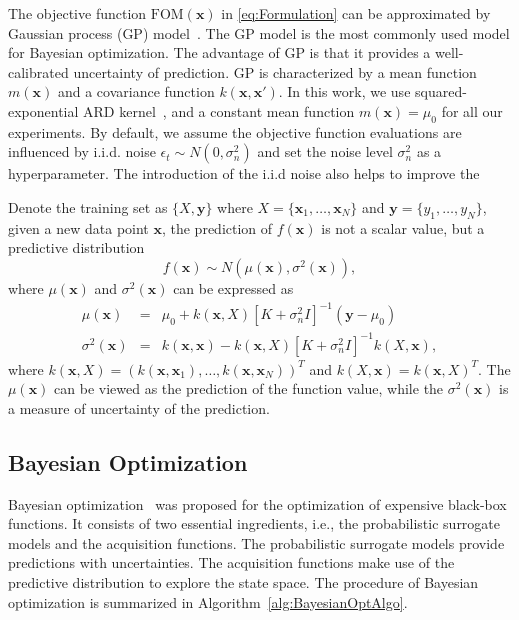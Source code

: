 The objective function $\mathrm{FOM}(\bm{x})$ in \eqref{eq:Formulation} can be
approximated by Gaussian process (GP) model~\cite{GPML}. The GP model is the
most commonly used model for Bayesian optimization. The advantage of GP is that
it provides a well-calibrated uncertainty of prediction. GP is characterized by
a mean function $m(\bm{x})$ and a covariance function $k(\bm{x}, \bm{x'})$. In
this work, we use squared-exponential ARD kernel~\cite{GPML}, and a constant
mean function $m(\bm{x}) = \mu_0$ for all our experiments. By default, we
assume the objective function evaluations are influenced by i.i.d. noise
$\epsilon_t \sim N(0, \sigma_n^2)$ and set the noise level $\sigma_n^2$ as a
hyperparameter.  The introduction of the i.i.d noise also helps to improve the

Denote the training set as $\{X, \bm{y}\}$ where $X = \{\bm{x}_1, \dots, \bm{x}_N\}$ and $\bm{y} = \{y_1, \dots, y_N\}$, given a new data point $\bm{x}$, the prediction of $f(\bm{x})$ is not a scalar value, but a predictive distribution
\begin{equation}
f(\bm{x}) \sim N(\mu(\bm{x}),
\sigma^2(\bm{x})),
\label{eq:GPRPred}
\end{equation}
where $\mu(\bm{x})$ and $\sigma^2(\bm{x})$ can be expressed as
\begin{equation}
        \begin{array}{lll}
            \mu(\bm{x})      &=& \mu_0 + k(\bm{x},X)[K+\sigma_n^2I]^{-1}(\bm{y} - \mu_0) \\
            \sigma^2(\bm{x}) &=& k(\bm{x}, \bm{x}) - k(\bm{x}, X)[K+\sigma_n^2I]^{-1}k(X, \bm{x}),
        \end{array}
    \label{eq:GPRPredEqNoisy}
\end{equation}
where $k(\bm{x}, X) = (k(\bm{x}, \bm{x}_1), \dots, k(\bm{x},
\bm{x}_N))^T$ and $k(X, \bm{x}) = k(\bm{x}, X)^T$. The
$\mu(\bm{x})$ can be viewed as the prediction of the function value, while
the $\sigma^2(\bm{x})$ is a measure of uncertainty of the prediction.

\subsection{Bayesian Optimization}

Bayesian optimization~\cite{shahriari2016taking} was proposed for the
optimization of expensive black-box functions. It consists of two essential
ingredients, i.e., the probabilistic surrogate models and the acquisition
functions. The probabilistic surrogate models provide predictions with
uncertainties. The acquisition functions make use of the predictive
distribution to explore the state space. The procedure of Bayesian optimization
is summarized in Algorithm~\ref{alg:BayesianOptAlgo}.


